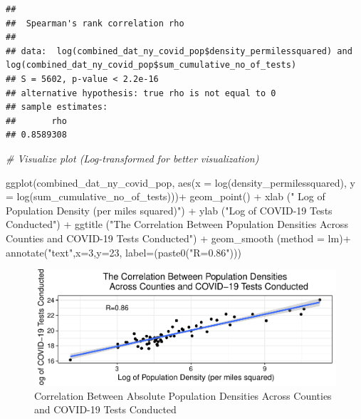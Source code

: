 \documentclass[
  12pt,
]{article}
\newenvironment{Shaded}{\begin{snugshade}}{\end{snugshade}}
\newcommand{\AttributeTok}[1]{\textcolor[rgb]{0.77,0.63,0.00}{#1}}
\newcommand{\CommentTok}[1]{\textcolor[rgb]{0.56,0.35,0.01}{\textit{#1}}}
\newcommand{\DecValTok}[1]{\textcolor[rgb]{0.00,0.00,0.81}{#1}}
\newcommand{\FunctionTok}[1]{\textcolor[rgb]{0.00,0.00,0.00}{#1}}
\newcommand{\NormalTok}[1]{#1}
\newcommand{\SpecialCharTok}[1]{\textcolor[rgb]{0.00,0.00,0.00}{#1}}
\newcommand{\StringTok}[1]{\textcolor[rgb]{0.31,0.60,0.02}{#1}}
\begin{document}
\begin{verbatim}
## 
##  Spearman's rank correlation rho
## 
## data:  log(combined_dat_ny_covid_pop$density_permilessquared) and log(combined_dat_ny_covid_pop$sum_cumulative_no_of_tests)
## S = 5602, p-value < 2.2e-16
## alternative hypothesis: true rho is not equal to 0
## sample estimates:
##       rho 
## 0.8589308
\end{verbatim}

\begin{Shaded}
\begin{Highlighting}[]
\CommentTok{\# Visualize plot (Log{-}transformed for better visualization)}

\FunctionTok{ggplot}\NormalTok{(combined\_dat\_ny\_covid\_pop, }\FunctionTok{aes}\NormalTok{(}\AttributeTok{x =} \FunctionTok{log}\NormalTok{(density\_permilessquared), }\AttributeTok{y =} \FunctionTok{log}\NormalTok{(sum\_cumulative\_no\_of\_tests)))}\SpecialCharTok{+}
  \FunctionTok{geom\_point}\NormalTok{() }\SpecialCharTok{+}
  \FunctionTok{xlab}\NormalTok{ (}\StringTok{" Log of Population Density (per miles squared)"}\NormalTok{) }\SpecialCharTok{+}
  \FunctionTok{ylab}\NormalTok{ (}\StringTok{"Log of COVID{-}19 Tests Conducted"}\NormalTok{) }\SpecialCharTok{+}
  \FunctionTok{ggtitle}\NormalTok{ (}\StringTok{"The Correlation Between Population Densities}
\StringTok{           Across Counties and COVID{-}19 Tests Conducted"}\NormalTok{) }\SpecialCharTok{+}
  \FunctionTok{geom\_smooth}\NormalTok{ (}\AttributeTok{method =} \StringTok{\textquotesingle{}lm\textquotesingle{}}\NormalTok{)}\SpecialCharTok{+}
  \FunctionTok{annotate}\NormalTok{(}\StringTok{"text"}\NormalTok{,}\AttributeTok{x=}\DecValTok{3}\NormalTok{,}\AttributeTok{y=}\DecValTok{23}\NormalTok{, }\AttributeTok{label=}\NormalTok{(}\FunctionTok{paste0}\NormalTok{(}\StringTok{"R=0.86"}\NormalTok{)))}
\end{Highlighting}
\end{Shaded}

\begin{figure}

\includegraphics{EDA_Final_Group_Project_files/figure-latex/unnamed-chunk-24-1} \hfill{}

\caption{Correlation Between Absolute Population Densities Across Counties and COVID-19 Tests Conducted}\label{fig:unnamed-chunk-24}
\end{figure}
\end{document}
